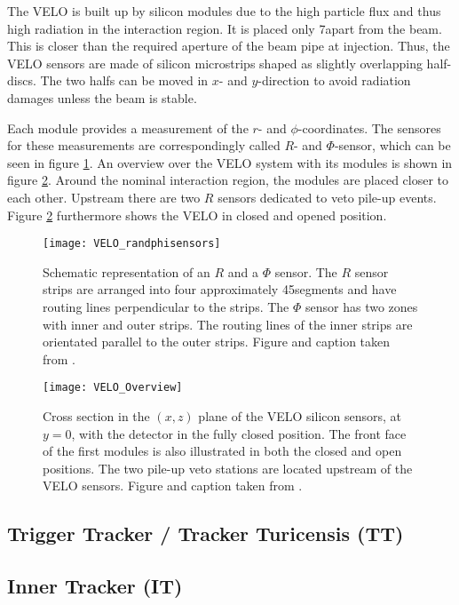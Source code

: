 The VELO is built up by silicon modules due to the high particle flux and thus high radiation in the interaction region. It is placed only 7\mm apart from the beam. This is closer than the required aperture of the \lhcb beam pipe at injection. Thus, the VELO sensors are made of silicon microstrips shaped as slightly overlapping half-discs. The two halfs can be moved in $x$- and $y$-direction to avoid radiation damages unless the beam is stable.

Each module provides a measurement of the $r$- and $\phi$-coordinates.
The sensores for these measurements are correspondingly called $R$- and $\Phi$-sensor, which can be seen in figure \ref{fig:VELO_RandPhiSensor}.
An overview over the VELO system with its modules is shown in figure \ref{fig:VELO_Overview}. Around the nominal interaction region, the modules are placed closer to each other. Upstream there are two $R$ sensors dedicated to veto pile-up events. 
Figure \ref{fig:VELO_Overview} furthermore shows the VELO in closed and opened position.
\begin{figure}[hptb]
	\texttt{[image: VELO\_randphisensors]}	
	\caption{Schematic representation of an $R$ and a $\Phi$ sensor. The $R$ sensor strips are arranged into four approximately 45\degrees segments and have routing lines perpendicular to the strips. The $\Phi$ sensor has two zones with inner and outer strips. The routing lines of the inner strips
    are orientated parallel to the outer strips. Figure and caption taken from \cite{VELO_Performance}.}
	\label{fig:VELO_RandPhiSensor}
\end{figure}
\begin{figure}[hptb]
	\texttt{[image: VELO\_Overview]}	
	\caption{Cross section in the $(x,z)$ plane of the VELO silicon sensors, at $y=0$, with the detector in the fully closed position. 
             The front face of the first modules is also illustrated in both the closed and open positions. 
             The two pile-up veto stations are located upstream of the VELO sensors.
             Figure and caption taken from \cite{detector}.}
	\label{fig:VELO_Overview}
\end{figure}

\subsection{Trigger Tracker / Tracker Turicensis (TT)}

\subsection{Inner Tracker (IT)}

